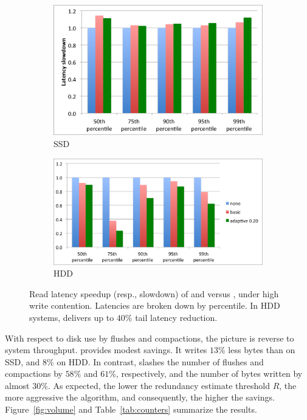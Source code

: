 \begin{figure}[t]
  \centering
  
  \begin{subfigure}[t]{.9\columnwidth}
      \includegraphics[width=\figw]{Figs/latency-ssd.png}
      \caption[]{SSD}
    \label{fig:latency:ssd}
  \end{subfigure}
  \begin{subfigure}[t]{1.1\columnwidth}
      \includegraphics[width=\figw]{Figs/latency-hdd.png}
      \caption[]{HDD}
    \label{fig:latency:hdd}
  \end{subfigure}

  \caption{Read latency speedup (resp., slowdown) of \basic\/ and \adp\/ versus \none, under high write contention.
  Latencies are broken down by percentile. In HDD systems, \adp\/ delivers up to $40$\% tail latency reduction. 
  }
  
  \label{fig:latency}
\end{figure}

With respect to disk use by flushes and compactions, the picture is reverse to system throughput. 
\basic\/ provides modest savings. It writes $13$\% less bytes than \none\/ on SSD, and $8$\% 
on HDD. In contrast, \adp slashes the number of flushes and compactions by $58\%$ and $61$\%, 
respectively, and the number of bytes written by almost $30\%$. As expected, the lower the 
redundancy estimate threshold $R$, the more aggressive the algorithm, and consequently, 
the higher the savings. Figure~\ref{fig:volume} and Table~\ref{tab:counters} summarize the results. 

